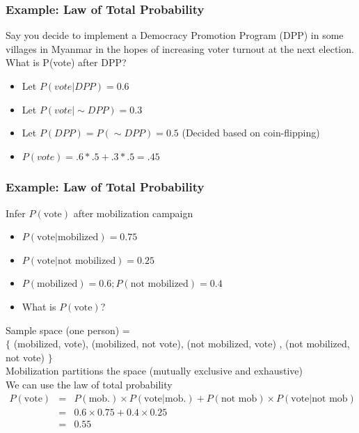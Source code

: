 \documentclass[aspectratio=169]{beamer}
\numberwithin{equation}{section}
\begin{document}
\begin{frame}
\frametitle{Example: Law of Total Probability}
 Say you decide to implement a Democracy Promotion Program (DPP) in some villages in Myanmar in the hopes of increasing voter turnout at the next election. What is P(vote) after DPP?\pause
 \begin{itemize}
 \item Let $P(vote|DPP)=0.6$\pause
 \item Let $P(vote|\sim DPP)=0.3$\pause
 \item Let $P(DPP) = P(\sim DPP) = 0.5$ (Decided based on coin-flipping)\pause
 \item $P(vote)= .6*.5+.3*.5= .45$
 \end{itemize}
\end{frame}


\begin{frame}
\frametitle{Example: Law of Total Probability} 

Infer $P(\text{vote})$ after mobilization campaign \pause 
\begin{itemize}
\item[-] $P(\text{vote}|\text{mobilized} ) = 0.75$ \pause 
\item[-] $P(\text{vote}| \text{not mobilized} ) = 0.25 $ \pause 
\item[-] $P(\text{mobilized}) = 0.6 ; P(\text{not mobilized} ) = 0.4 $ \pause 
\item[-] What is $P(\text{vote})$? \pause 
\end{itemize}

Sample space (one person) = \\$\{$ (mobilized, vote), (mobilized, not vote), (not mobilized, vote) , (not mobilized, not vote) $\}$\\
\alert{Mobilization} partitions the space (mutually exclusive and exhaustive)  \pause \\
We can use the law of total probability \pause 
\begin{eqnarray}
P(\text{vote} ) & = & P(\text{mob.} ) \times P(\text{vote}| \text{mob.} ) + P(\text{not mob}) \times P(\text{vote} | \text{not mob} ) \nonumber \\
 & = & 0.6 \times 0.75 + 0.4 \times 0.25 \nonumber \\
  & = & 0.55 \nonumber 
  \end{eqnarray}

\end{frame}
\end{document}
